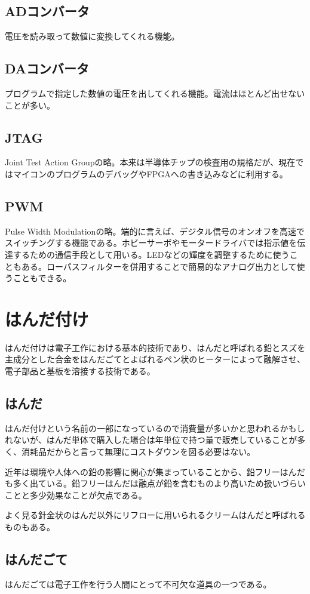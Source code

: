 \documentclass[a4paper,titlepage,here]{ujarticle}
\begin{document}
\subsection{ADコンバータ}
電圧を読み取って数値に変換してくれる機能。
\subsection{DAコンバータ}
プログラムで指定した数値の電圧を出してくれる機能。電流はほとんど出せないことが多い。
\subsection{JTAG}
Joint Test Action Groupの略。本来は半導体チップの検査用の規格だが、現在ではマイコンのプログラムのデバッグやFPGAへの書き込みなどに利用する。
\subsection{PWM}
Pulse Width Modulationの略。端的に言えば、デジタル信号のオンオフを高速でスイッチングする機能である。ホビーサーボやモータードライバでは指示値を伝達するための通信手段として用いる。LEDなどの輝度を調整するために使うこともある。ローパスフィルターを併用することで簡易的なアナログ出力として使うこともできる。
\section{はんだ付け}
はんだ付けは電子工作における基本的技術であり、はんだと呼ばれる鉛とスズを主成分とした合金をはんだごてとよばれるペン状のヒーターによって融解させ、電子部品と基板を溶接する技術である。
\subsection{はんだ}
はんだ付けという名前の一部になっているので消費量が多いかと思われるかもしれないが、はんだ単体で購入した場合は年単位で持つ量で販売していることが多く、消耗品だからと言って無理にコストダウンを図る必要はない。

近年は環境や人体への鉛の影響に関心が集まっていることから、鉛フリーはんだも多く出ている。鉛フリーはんだは融点が鉛を含むものより高いため扱いづらいことと多少効果なことが欠点である。

よく見る針金状のはんだ以外にリフローに用いられるクリームはんだと呼ばれるものもある。
\subsection{はんだごて}
はんだごては電子工作を行う人間にとって不可欠な道具の一つである。
\end{document}
